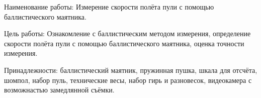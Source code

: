 Наименование работы: 
Измерение скорости полёта пули с помощью баллистического маятника.

Цель работы: 
Ознакомление с баллистическим методом измерения,
определение скорости полёта пули с помощью баллистического маятника,
оценка точности измерения.

Принадлежности:
баллистический маятник, пружинная пушка, шкала для отсчёта, шомпол,
набор пуль, технические весы, набор гирь и разновесок, видеокамера с возможнастью замедлянной съёмки.